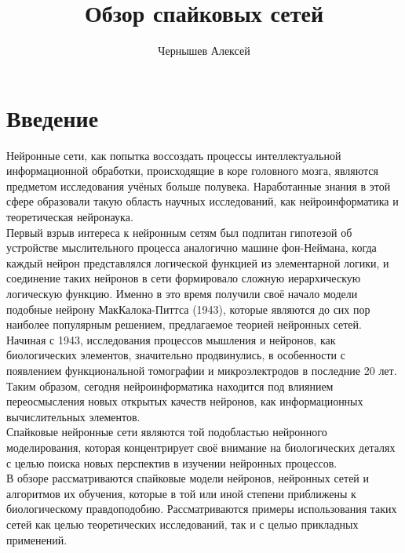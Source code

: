 \documentclass[a4paper,10pt]{article}
\title{Обзор спайковых сетей}
\author{Чернышев Алексей}
\begin{document}


\tableofcontents
\clearpage
\section{Введение}
\indent Нейронные сети, как попытка воссоздать процессы интеллектуальной информационной обработки, происходящие в коре головного мозга, являются предметом исследования учёных больше полувека. Наработанные знания в этой сфере образовали такую область научных исследований, как нейроинформатика и теоретическая нейронаука.\\
\indent Первый взрыв интереса к нейронным сетям был подпитан гипотезой об устройстве мыслительного процесса аналогично машине фон-Неймана, когда каждый нейрон представлялся логической функцией из элементарной логики, и соединение таких нейронов в сети формировало сложную иерархическую логическую функцию. Именно в это время получили своё начало модели подобные нейрону МакКалока-Питтса (1943), которые являются до сих пор наиболее популярным решением, предлагаемое теорией нейронных сетей.\\
\indent Начиная с 1943, исследования процессов мышления и нейронов, как биологических элементов, значительно продвинулись, в особенности с появлением функциональной томографии и микроэлектродов в последние 20 лет. Таким образом, сегодня нейроинформатика находится под влиянием переосмысления новых открытых качеств нейронов\cite{BohteReview}, как информационных вычислительных элементов.\\
\indent Спайковые нейронные сети являются той подобластью нейронного моделирования, которая концентрирует своё внимание на биологических деталях с целью поиска новых перспектив в изучении нейронных процессов.\\
\indent В обзоре рассматриваются спайковые модели нейронов, нейронных сетей и алгоритмов их обучения, которые в той или иной степени приближены к биологическому правдоподобию. Рассматриваются примеры использования таких сетей как целью теоретических исследований, так и с целью прикладных применений.\\
\end{document}
